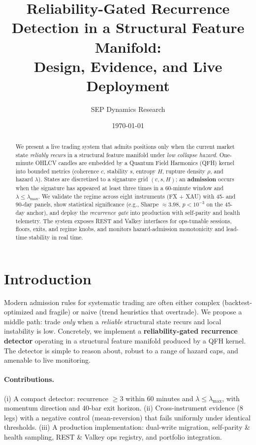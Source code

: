\documentclass[11pt]{article}
\title{Reliability-Gated Recurrence Detection in a Structural Feature Manifold:\\
Design, Evidence, and Live Deployment}
\author{SEP Dynamics Research}
\date{\today}
\begin{document}
\maketitle

\begin{abstract}
We present a live trading system that admits positions only when the current market state
\emph{reliably recurs} in a structural feature manifold under \emph{low collapse hazard}.
One-minute OHLCV candles are embedded by a Quantum Field Harmonics (QFH) kernel into bounded
metrics (coherence $c$, stability $s$, entropy $H$, rupture density $\rho$, and hazard $\lambda$).
States are discretized to a signature grid $(c,s,H)$; an \textbf{admission} occurs when the
signature has appeared at least three times in a 60-minute window and $\lambda \le \lambda_{\max}$.
We validate the regime across eight instruments (FX + XAU) with 45- and 90-day panels, show
statistical significance (e.g., Sharpe $\approx 3.98$, $p<10^{-3}$ on the 45-day anchor), and
deploy the \emph{recurrence gate} into production with self-parity and health telemetry. The system
exposes REST and Valkey interfaces for ops-tunable sessions, floors, exits, and regime knobs, and
monitors hazard-admission monotonicity and lead-time stability in real time.
\end{abstract}

\section{Introduction}
Modern admission rules for systematic trading are often either complex (backtest-optimized and fragile)
or naive (trend heuristics that overtrade). We propose a middle path: trade \emph{only} when a
\emph{reliable} structural state recurs and local instability is low. Concretely, we implement a
\textbf{reliability-gated recurrence detector} operating in a structural feature manifold produced by a
QFH kernel. The detector is simple to reason about, robust to a range of hazard caps, and amenable to
live monitoring.

\paragraph{Contributions.}
(i) A compact detector: recurrence $\ge 3$ within 60 minutes and $\lambda \le \lambda_{\max}$, with
momentum direction and 40-bar exit horizon. (ii) Cross-instrument evidence (8 legs) with a negative control
(mean-reversion) that fails uniformly under identical thresholds. (iii) A production implementation: dual-write
migration, self-parity \& health sampling, REST \& Valkey ops registry, and portfolio integration.
\end{document}
